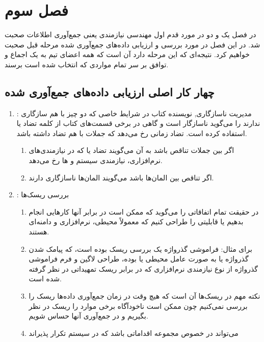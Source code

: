 \newpage

\section{فصل سوم}

در فصل یک و دو در مورد قدم اول  مهندسی نیازمندی یعنی جمع‌آوری اطلاعات صحبت شد.
در این فصل در مورد بررسی و ارزیابی داده‌های جمع‌آوری شده مرحله قبل صحبت خواهیم
کرد. نتیجه‌ای که این مرحله دارد آن است که همه اعضای تیم به یک اجماع و توافق بر
سر تمام مواردی که انتخاب شده است برسند.

\subsection{چهار کار اصلی ارزیابی داده‌های جمع‌آوری شده}

\begin{enumerate}
    \item {}: مدیریت ناسازگاری, نویسنده کتاب در شرایط
    خاصی که دو چیز با هم سازگاری ندارند را می‌گوید ناسازگار است و گاهی در برخی
    قسمت‌های کتاب از کلمه تضاد یا  استفاده کرده است. تضاد زمانی رخ
    می‌دهد که جملات با هم تضاد داشته باشد. \begin{enumerate}
        \item اگر بین جملات تناقص باشد به آن می‌گویند تضاد یا  که
        در نیازمندی‌های نرم‌افزاری، نیازمندی سیستم و ها رخ
        می‌دهد.
        \item اگر تناقص بین المان‌ها باشد می‌گویند المان‌ها ناسازگاری دارند.
    \end{enumerate}
    \item {}: بررسی ریسک‌ها \begin{enumerate}
        \item در حقیقت تمام اتفاقاتی را می‌گوید که ممکن است در برابر آنها
        کارهایی انجام بدهیم یا قابلیتی را طراحی کنیم که معمولاً محیطی،
        نرم‌افزاری و دامنه‌ای هستند.
        \item برای مثال: فراموشی گذرواژه یک بررسی ریسک بوده است، که پیامک شدن
        گذرواژه یا  به صورت عامل محیطی یا  بوده، طراحی
        لاگین و فرم فراموشی گذرواژه از نوع نیازمندی نرم‌افزاری که در برابر ریسک
        تمهیداتی در نظر گرفته شده است.
        \item نکته مهم در ریسک‌ها آن است که هیچ وقت در زمان جمع‌آوری داده‌ها
        ریسک را بررسی نمی‌کنیم چون ممکن است ناخودآگاه برخی موارد را ریسک در نظر
        بگیریم و در جمع‌آوری آنها حساس شویم.
        \item می‌تواند در خصوص مجموعه اقداماتی باشد که در سیستم تکرار پذیر‌اند

\end{enumerate}
\end{enumerate}
